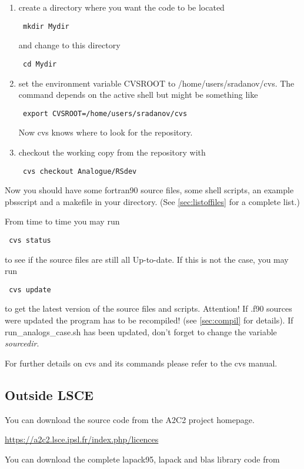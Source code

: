 \documentclass[11p,a4paper]{article}
\begin{document}
\begin{enumerate}
\item create a directory where you want the code to be located
\begin{verbatim}
 mkdir Mydir
\end{verbatim}
and change to this directory
\begin{verbatim}
 cd Mydir
\end{verbatim}
\item set the environment variable CVSROOT to /home/users/sradanov/cvs. The command depends on the active shell but might be something like 
\begin{verbatim}
 export CVSROOT=/home/users/sradanov/cvs
\end{verbatim}
Now cvs knows where to look for the repository.
\item checkout the working copy from the repository with 
\begin{verbatim}
 cvs checkout Analogue/RSdev 
\end{verbatim}
\end{enumerate}
Now you should have some fortran90 source files, some shell scripts, an example pbsscript and a makefile in your directory. (See \autoref{sec:listoffiles} for a complete list.)

From time to time you may run
\begin{verbatim}
 cvs status
\end{verbatim}
to see if the source files are still all Up-to-date. If this is not the case, you may run
\begin{verbatim}
 cvs update
\end{verbatim}
to get the latest version of the source files and scripts. Attention! If .f90 sources were updated the program has to be recompiled! (see \autoref{sec:compil} for details). If run\_analogs\_case.sh has been updated, don't forget to change the variable \textit{sourcedir}. 

For further details on cvs and its commands please refer to the cvs manual.
\subsection{Outside LSCE}
You can download the source code from the A2C2 project homepage.

\href{https://a2c2.lsce.ipsl.fr/index.php/licences}{https://a2c2.lsce.ipsl.fr/index.php/licences}

You can download the complete lapack95, lapack and blas library code from 
\end{document}
